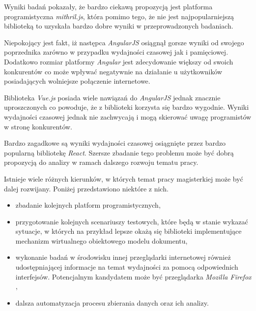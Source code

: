 \documentclass[polish, twoside, 12pt]{mwart}
\begin{document}
Wyniki badań pokazały, że bardzo ciekawą propozycją jest platforma programistyczna \emph{mithril.js}, która pomimo tego, że nie jest najpopularniejszą biblioteką to uzyskała bardzo dobre wyniki w przeprowadzonych badaniach. 

Niepokojący jest fakt, iż następca \emph{AngularJS} osiągnął gorsze wyniki od swojego poprzednika zarówno w przypadku wydajności czasowej jak i pamięciowej. Dodatkowo rozmiar platformy \emph{Angular} jest zdecydowanie większy od swoich konkurentów co może wpływać negatywnie na działanie u użytkowników posiadających wolniejsze połączenie internetowe.

Biblioteka \emph{Vue.js} posiada wiele nawiązań do \emph{AngularJS} jednak znacznie uproszczonych co powoduje, że z biblioteki korzysta się bardzo wygodnie. Wyniki wydajności czasowej jednak nie zachwycają i mogą skierować uwagę programistów w stronę konkurentów.

Bardzo zagadkowe są wyniki wydajności czasowej osiągnięte przez bardzo popularną bibliotekę \emph{React}. Szersze zbadanie tego problemu może być dobrą propozycją do analizy w ramach dalszego rozwoju tematu pracy.

Istnieje wiele różnych kierunków, w których temat pracy magisterkiej może być dalej rozwijany. Poniżej przedstawiono niektóre z nich.

\begin{itemize}
  \item zbadanie kolejnych platform programistycznych,
  \item przygotowanie kolejnych scenariuszy testowych, które będą w stanie wykazać sytuacje, w których na przykład lepsze okażą się biblioteki implementujące mechanizm wirtualnego obiektowego modelu dokumentu,
  \item wykonanie badań w środowisku innej przeglądarki internetowej również udostępniającej informacje na temat wydajności za pomocą odpowiednich interfejsów. Potencjalnym kandydatem może być przeglądarka \emph{Mozilla Firefox} \cite{firefox},
  \item dalsza automatyzacja procesu zbierania danych oraz ich analizy.
\end{itemize}
\end{document}
